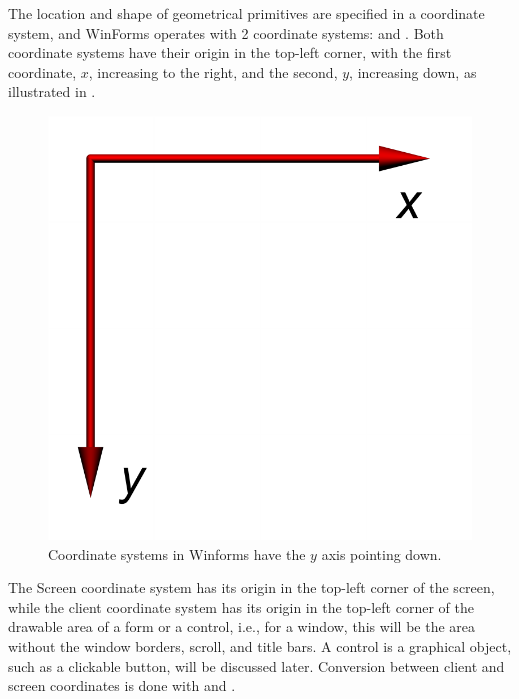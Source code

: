 \documentclass[fsharpNotes.tex]{subfiles}
\begin{document}
The location and shape of geometrical primitives are specified in a coordinate system, and WinForms operates with 2 coordinate systems:  and . Both coordinate systems have their origin in the top-left corner, with the first coordinate, $x$, increasing to the right, and the second, $y$, increasing down, as illustrated in .
%
\begin{figure}
  \centering
  \includegraphics[scale=0.3]{coordinateSystem}
  \caption{Coordinate systems in Winforms have the $y$ axis pointing down.}
  \label{fig:coordinateSystem}
\end{figure}
%
The Screen coordinate system has its origin in the top-left corner of the screen, while the client coordinate system has its origin in the top-left corner of the drawable area of a form or a control, i.e., for a window, this will be the area without the window borders, scroll, and title bars. A control is a graphical object, such as a clickable button, will be discussed later. Conversion between client and screen coordinates is done with  and . %
\end{document}
